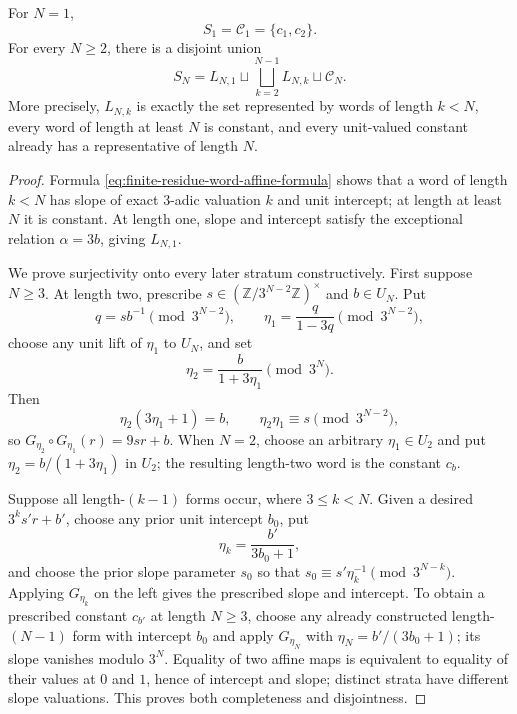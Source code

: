 \begin{theorem}
\label{thm:finite-residue-semigroup-normal-form}
For $N=1$,
\[
 S_1=\mathcal C_1=\{c_1,c_2\}.
\]
For every $N\geq2$, there is a disjoint union
\begin{equation}
\label{eq:finite-residue-semigroup-strata}
 S_N=L_{N,1}\sqcup
     \bigsqcup_{k=2}^{N-1}L_{N,k}\sqcup\mathcal C_N.
\end{equation}
More precisely, $L_{N,k}$ is exactly the set represented by words of length
$k<N$, every word of length at least $N$ is constant, and every unit-valued
constant already has a representative of length $N$.
\end{theorem}

\begin{proof}
Formula \eqref{eq:finite-residue-word-affine-formula} shows that a word of
length $k<N$ has slope of exact $3$-adic valuation $k$ and unit intercept;
at length at least $N$ it is constant.  At length one, slope and intercept
satisfy the exceptional relation $\alpha=3b$, giving $L_{N,1}$.

We prove surjectivity onto every later stratum constructively.  First suppose
$N\geq3$.  At length two, prescribe
$s\in(\mathbb Z/3^{N-2}\mathbb Z)^\times$ and $b\in U_N$.
Put
\[
 q=sb^{-1}\pmod{3^{N-2}},
 \qquad
 \eta_1=\frac q{1-3q}\pmod{3^{N-2}},
\]
choose any unit lift of $\eta_1$ to $U_N$, and set
\[
 \eta_2=\frac b{1+3\eta_1}\pmod{3^N}.
\]
Then
\[
 \eta_2(3\eta_1+1)=b,
 \qquad \eta_2\eta_1\equiv s\pmod{3^{N-2}},
\]
so $G_{\eta_2}\circ G_{\eta_1}(r)=9sr+b$.  When $N=2$, choose an arbitrary
$\eta_1\in U_2$ and put $\eta_2=b/(1+3\eta_1)$ in $U_2$; the resulting
length-two word is the constant $c_b$.

Suppose all length-$(k-1)$ forms occur, where $3\leq k<N$.  Given a desired
$3^ks'r+b'$, choose any prior unit intercept $b_0$, put
\[
 \eta_k=\frac{b'}{3b_0+1},
\]
and choose the prior slope parameter $s_0$ so that
$s_0\equiv s'\eta_k^{-1}\pmod{3^{N-k}}$.  Applying $G_{\eta_k}$ on the left
gives the prescribed slope and intercept.  To obtain a prescribed constant
$c_{b'}$ at length $N\geq3$, choose any already constructed length-$(N-1)$
form with intercept $b_0$ and apply
$G_{\eta_N}$ with $\eta_N=b'/(3b_0+1)$; its slope vanishes modulo $3^N$.
Equality of two affine maps is equivalent to equality of their
values at $0$ and $1$, hence of intercept and slope; distinct strata have
different slope valuations.  This proves both completeness and disjointness.
\end{proof}

